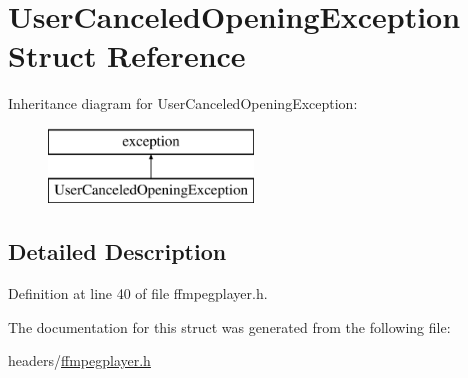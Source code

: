 \hypertarget{structUserCanceledOpeningException}{}\section{User\+Canceled\+Opening\+Exception Struct Reference}
\label{structUserCanceledOpeningException}
Inheritance diagram for User\+Canceled\+Opening\+Exception\+:\begin{figure}[H]
\begin{center}
\leavevmode
\includegraphics[height=2.000000cm]{structUserCanceledOpeningException}
\end{center}
\end{figure}


\subsection{Detailed Description}


Definition at line 40 of file ffmpegplayer.\+h.



The documentation for this struct was generated from the following file\+:\begin{DoxyCompactItemize}
\item 
headers/\hyperlink{ffmpegplayer_8h}{ffmpegplayer.\+h}\end{DoxyCompactItemize}
